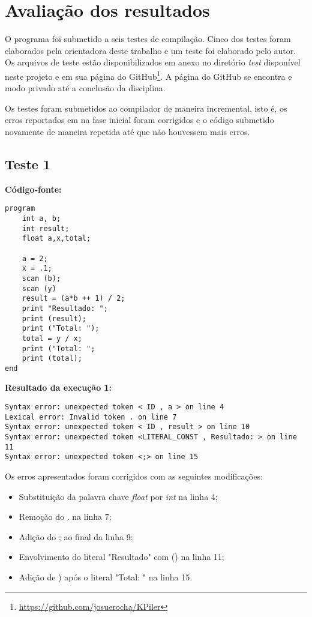 \chapter[Avaliação dos resultados]{Avaliação dos resultados}
\label{cap:avaliacao}

O programa foi submetido a seis testes de compilação. Cinco dos testes foram elaborados pela orientadora deste trabalho e um teste foi elaborado pelo autor. Os arquivos de teste estão disponibilizados em anexo no diretório \textit{test} disponível neste projeto e em sua página do GitHub\footnote{\url{https://github.com/josuerocha/KPiler}}. A página do GitHub se encontra e modo privado até a conclusão da disciplina.

Os testes foram submetidos ao compilador de maneira incremental, isto é, os erros reportados em na fase inicial foram corrigidos e o código submetido novamente de maneira repetida até que não houvessem mais erros.


\section{\textbf{Teste 1}}

\textbf{Código-fonte:}
        
\begin{lstlisting}
program
	int a, b;
	int result;
	float a,x,total;

	a = 2;
	x = .1;
	scan (b);
	scan (y)
	result = (a*b ++ 1) / 2;
	print "Resultado: ";
	print (result);
	print ("Total: ");
	total = y / x;
	print ("Total: ";
	print (total);
end
\end{lstlisting}
        
\textbf{Resultado da execução 1:}
        
 \begin{lstlisting}
Syntax error: unexpected token < ID , a > on line 4
Lexical error: Invalid token . on line 7
Syntax error: unexpected token < ID , result > on line 10
Syntax error: unexpected token <LITERAL_CONST , Resultado: > on line 11
Syntax error: unexpected token <;> on line 15
\end{lstlisting}

Os erros apresentados foram corrigidos com as seguintes modificações:
\begin{itemize}
    \item Substituição da palavra chave \textit{float} por \textit{int} na linha 4;
    
    \item Remoção do . na linha 7;
    
    \item Adição do ; ao final da linha 9;
    
    \item Envolvimento do literal "Resultado" com () na linha 11;
    
    \item Adição de ) após o literal "Total: " na linha 15.
\end{itemize}

